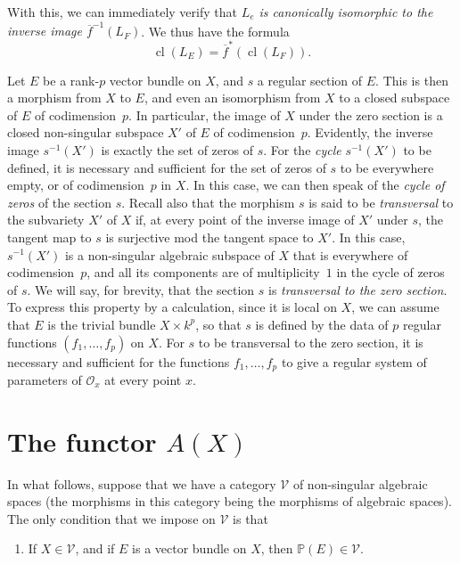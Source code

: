 \documentclass{article}
\newcommand{\scr}[1]{{\mathscr{#1}}}
\renewcommand{\cal}[1]{{\mathcal{#1}}}
\DeclareMathOperator{\cl}{cl}
\newcommand{\oldpage}[1]{\marginpar{\footnotesize$\Big\vert$ \textit{p.~#1}}}
\begin{document}
With this, we can immediately verify that \emph{$L_e$ is canonically isomorphic to the inverse image $\overline{f}^{-1}(L_F)$}.
We thus have the formula
\[
  \cl(L_E) = \overline{f}^*(\cl(L_F)).
\]

Let $E$ be a rank-$p$ vector bundle on $X$, and $s$ a regular section of $E$.
This is then a morphism from $X$ to $E$, and even an isomorphism from $X$ to a closed subspace of $E$ of codimension~$p$.
In particular, the image of $X$ under the zero section is a closed non-singular subspace $X'$ of $E$ of codimension~$p$.
Evidently, the inverse image $s^{-1}(X')$ is exactly the set of zeros of $s$.
For the \emph{cycle} $s^{-1}(X')$ to be defined, it is necessary and sufficient for the set of zeros of $s$ to be everywhere empty, or of codimension~$p$ in $X$.
In this case, we can then speak of the \emph{cycle of zeros} of the section $s$.
Recall also that the morphism $s$ is said to be \emph{transversal} to the subvariety $X'$ of $X$ if, at every point of the inverse image of $X'$ under $s$, the tangent map to $s$ is surjective mod the tangent space to $X'$.
In this case, $s^{-1}(X')$ is a non-singular algebraic subspace of $X$ that is everywhere of codimension~$p$, and all its components are of multiplicity~$1$ in the cycle of zeros of $s$.
We will say, for brevity, that the section $s$ is \emph{transversal to the zero section}.
To express this property by a calculation, since it is local on $X$, we can assume that $E$ is the trivial bundle $X\times k^p$, so that $s$ is defined by the data of $p$ regular functions $(f_1,\ldots,f_p)$ on $X$.
For $s$ to be transversal to the zero section, it is necessary and sufficient for the functions $f_1,\ldots,f_p$ to give a regular system of parameters of $\scr{O}_x$ at every point $x$.


\section{The functor \texorpdfstring{$A(X)$}{A(X)}}
\label{section2}

\oldpage{140}

In what follows, suppose that we have a category $\cal{V}$ of non-singular algebraic spaces (the morphisms in this category being the morphisms of algebraic spaces).
The only condition that we impose on $\cal{V}$ is that
\begin{enumerate}[({V}1)]
  \item\label{axiomV1}
    If $X\in\cal{V}$, and if $E$ is a vector bundle on $X$, then $\mathbb{P}(E)\in\cal{V}$.
\end{enumerate}
\end{document}
